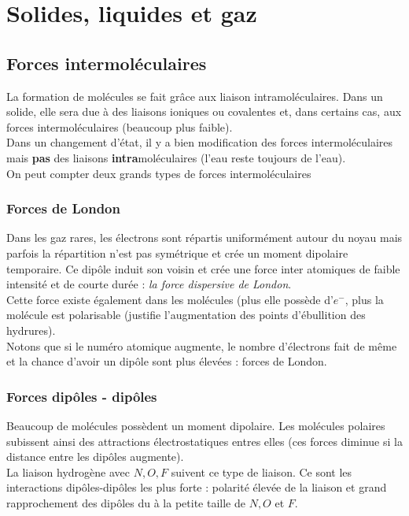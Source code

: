 \documentclass[12pt, a4paper]{article}
\begin{document}
\section{Solides, liquides et gaz}
\subsection{Forces intermoléculaires}
La formation de molécules se fait grâce aux liaison intramoléculaires. Dans un solide, elle sera due à des liaisons ioniques ou covalentes et, dans certains cas, aux forces intermoléculaires (beaucoup plus faible).\\

Dans un changement d'état, il y a bien modification des forces intermoléculaires mais \textbf{pas} des liaisons \textbf{intra}moléculaires (l'eau reste toujours de l'eau).\\
On peut compter deux grands types de forces intermoléculaires
\subsubsection*{Forces de London}
Dans les gaz rares, les électrons sont répartis uniformément autour du noyau mais parfois la répartition n'est pas symétrique et crée un moment dipolaire temporaire. Ce dipôle induit son voisin et crée une force inter atomiques de faible intensité et de courte durée : \textit{la force dispersive de London}.\\

Cette force existe également dans les molécules (plus elle possède d'$e^-$, plus la molécule est polarisable (justifie l'augmentation des points d'ébullition des hydrures).\\
Notons que si le numéro atomique augmente, le nombre d'électrons fait de même et la chance d'avoir un dipôle sont plus élevées : forces de London.

\subsubsection*{Forces dipôles - dipôles}
Beaucoup de molécules possèdent un moment dipolaire. Les molécules polaires subissent ainsi des attractions électrostatiques entres elles (ces forces diminue si la distance entre les dipôles augmente).\\

La liaison hydrogène avec $N, O, F$ suivent ce type de liaison. Ce sont les interactions dipôles-dipôles les plus forte : polarité élevée de la liaison et grand rapprochement des dipôles du à la petite taille de $N, O$ et $F$.
\end{document}
